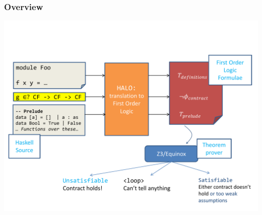 \documentclass[serif,professionalfont]{beamer}
\begin{document}
\begin{frame}[fragile]
  \frametitle{Overview}

  \includegraphics[width=\textwidth]{overview.pdf}

\end{frame}
\end{document}
